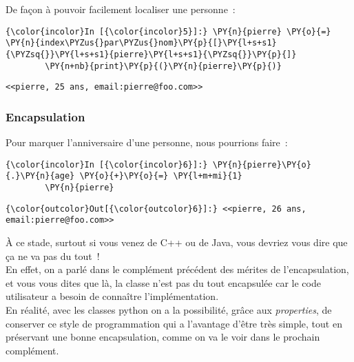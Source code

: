     De façon à pouvoir facilement localiser une personne~:

    \begin{Verbatim}[commandchars=\\\{\}]
{\color{incolor}In [{\color{incolor}5}]:} \PY{n}{pierre} \PY{o}{=} \PY{n}{index\PYZus{}par\PYZus{}nom}\PY{p}{[}\PY{l+s+s1}{\PYZsq{}}\PY{l+s+s1}{pierre}\PY{l+s+s1}{\PYZsq{}}\PY{p}{]}
        \PY{n+nb}{print}\PY{p}{(}\PY{n}{pierre}\PY{p}{)}
\end{Verbatim}


    \begin{Verbatim}[commandchars=\\\{\}]
<<pierre, 25 ans, email:pierre@foo.com>>

    \end{Verbatim}

    \hypertarget{encapsulation}{%
\subsubsection{Encapsulation}\label{encapsulation}}

    Pour marquer l'anniversaire d'une personne, nous pourrions faire~:

    \begin{Verbatim}[commandchars=\\\{\}]
{\color{incolor}In [{\color{incolor}6}]:} \PY{n}{pierre}\PY{o}{.}\PY{n}{age} \PY{o}{+}\PY{o}{=} \PY{l+m+mi}{1}
        \PY{n}{pierre}
\end{Verbatim}


\begin{Verbatim}[commandchars=\\\{\}]
{\color{outcolor}Out[{\color{outcolor}6}]:} <<pierre, 26 ans, email:pierre@foo.com>>
\end{Verbatim}
            
    À ce stade, surtout si vous venez de C++ ou de Java, vous devriez vous
dire que ça ne va pas du tout~!\\

En effet, on a parlé dans le complément précédent des mérites de
l'encapsulation, et vous vous dites que là, la classe n'est pas du tout
encapsulée car le code utilisateur a besoin de connaître
l'implémentation.\\

    En réalité, avec les classes python on a la possibilité, grâce aux
\emph{properties}, de conserver ce style de programmation qui a
l'avantage d'être très simple, tout en préservant une bonne
encapsulation, comme on va le voir dans le prochain complément.

